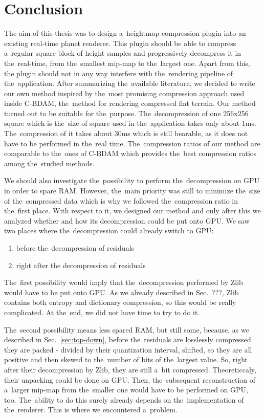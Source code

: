 \chapter{Conclusion}\label{sec:conclusion}

The aim of this thesis was to design a~heightmap compression plugin into an existing real-time planet renderer. This plugin should be able to compress a~regular square block of height samples and progressively decompress it in the~real-time, from the~smallest mip-map to the~largest one. Apart from this, the plugin should not in any way interfere with the~rendering pipeline of the~application. After summarizing the~available literature, we decided to write our own method inspired by the~most promising compression approach used inside C-BDAM, the~method for rendering compressed flat terrain. Our method turned out to be suitable for the~purpose. The~decompression of one 256x256 square which is the~size of square used in the~application takes only about 1ms. The~compression of it takes about 30ms which is still bearable, as it does not have to be performed in the~real time. The~compression ratios of our method are comparable to the~ones of C-BDAM which provides the~best compression ratios among the~studied methods.

We should also investigate the~possibility to perform the~decompression on GPU in order to spare RAM. However, the~main priority was still to minimize the~size of the~compressed data which is why we followed the~compression ratio in the~first place. With respect to it, we designed our method and only after this we analyzed whether and how its decompression could be put onto GPU. We saw two places where the~decompression could already switch to GPU:
\begin{enumerate}
	\item{before the~decompression of residuals}
	\item{right after the decompression of residuals}
\end{enumerate}

The~first possibility would imply that the~decompression performed by Zlib would have to be put onto GPU. As we already described in Sec.~???, Zlib contains both entropy and dictionary compression, so this would be really complicated. At the~end, we did not have time to try to do it.

The~second possibility means less spared RAM, but still some, because, as we described in Sec.~\ref{sec:top-down}, before the~residuals are losslessly compressed they are packed - divided by their quantization interval, shifted, so they are all positive and then skewed to the~number of bits of the~largest value. So, right after their decompression by Zlib, they are still a~bit compressed. Theoreticcaly, their unpacking could be done on GPU. Then, the~subsequent reconstruction of a~larger mip-map from the~smaller one would have to be performed on GPU, too. The~ability to do this surely already depends on the~implementation of the~renderer. This is where we encountered a~problem.

